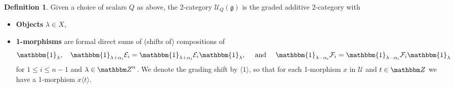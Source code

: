 \documentclass{amsart}
\numberwithin{equation}{section}
\theoremstyle{definition}
\newtheorem{definition}[thm]{Definition}
\def\Z{{\mathbbm Z}}
\def\1{\mathbbm{1}}%
\def\la{\langle}
\def\ra{\rangle}
\newcommand{\onel}{\1_{\lambda}}
\newcommand{\Ucat}{\mathcal{U}_Q}
\begin{document}
 \begin{definition} \label{def:2cat}
Given a choice of scalars $Q$ as above,  the 2-category $\Ucat(\mathfrak{g} )$ is the graded additive 2-category with
\begin{itemize}
\item \label{objects2cat} \textbf{Objects} $\lambda  \in X$,
\item \textbf{1-morphisms} are formal direct sums of (shifts of) compositions of
\[
\onel, \quad \1_{\lambda+\alpha_i} \mathcal{E}_i= \1_{\lambda+\alpha_i} \mathcal{E}_i\onel, \quad \text{ and }\quad
\1_{\lambda-\alpha_i} \mathcal{F}_i= \1_{\lambda-\alpha_i} \mathcal{F}_i\onel
\]
for $1 \leq i \leq n-1$ and $\lambda \in \Z^{n}$.  We denote the grading shift by $\la 1 \ra$, so that for each 1-morphism $x$ in $\mathcal{U}$ and $t\in \Z$ we have a 1-morphism $x\la t\ra$.


\end{itemize}
\end{definition}
\end{document}
